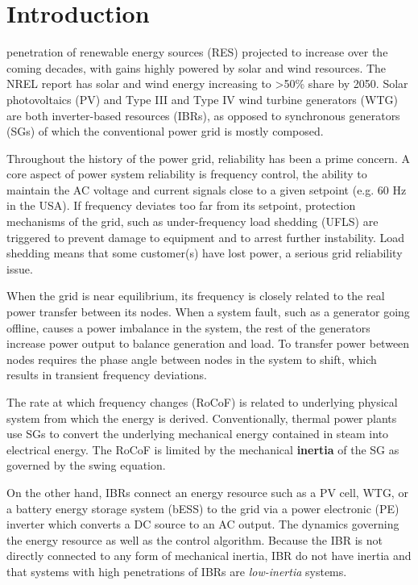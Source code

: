 \documentclass[journal]{IEEEtran}
\begin{document}
\section{Introduction}
 penetration of renewable energy sources (RES)
projected to increase over the coming decades, with gains highly powered by
solar and wind resources. The NREL report %
has solar and wind energy increasing to >50\% share by 2050. 
Solar photovoltaics (PV) and Type III and Type IV wind turbine generators
(WTG) are both inverter-based resources (IBRs), as opposed to synchronous
generators (SGs) of which the conventional power grid is mostly composed.

Throughout the history of the power grid, reliability has been a prime concern.
A core aspect of power system reliability is frequency control, the ability
to maintain the AC voltage and current signals close to a given setpoint
(e.g. 60 Hz in the USA). If frequency deviates too far from its setpoint,
protection mechanisms of the grid, such as under-frequency load shedding
(UFLS) are triggered to prevent damage to equipment and to arrest further
instability.  %
Load shedding means that some customer(s) have lost power, a serious grid
reliability issue.

When the grid is near equilibrium, its frequency is closely related
to the real power transfer between its nodes. When a system fault, such as a
generator going offline, causes a power imbalance in the system, 
the rest of the generators increase power output to balance
generation and load. To transfer power between nodes requires the phase angle
between nodes in the system to shift, which results in transient frequency
deviations.

The rate at which frequency changes (RoCoF) is related to underlying physical
system from which the energy is derived. Conventionally,
thermal power plants use SGs to convert the underlying mechanical energy
contained in steam into electrical energy. The RoCoF is limited by
the mechanical {\bf inertia} of the SG as governed by the swing equation.

On the other hand, IBRs connect an energy resource such as a PV cell,
WTG, or a battery energy storage system (bESS) to the grid via a 
power electronic (PE) inverter which converts a DC source to an AC output.
The dynamics governing the energy resource as well as the control algorithm.
Because the IBR is not directly connected to any form of mechanical inertia,
IBR do not have inertia and that systems with high penetrations of IBRs
are {\it low-inertia} systems. \cite[text]{}
\end{document}
